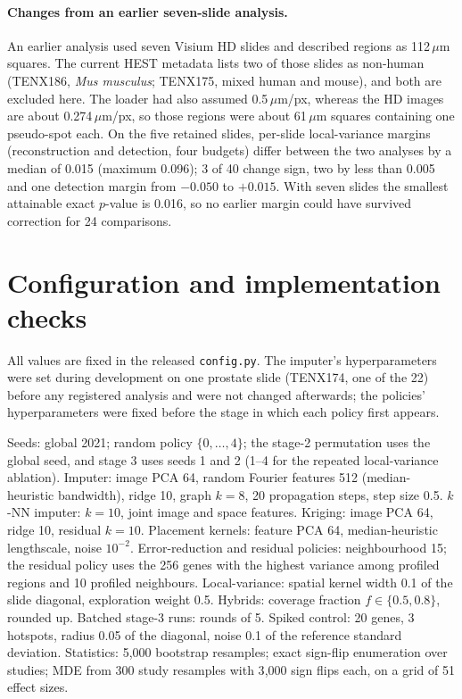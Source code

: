 \documentclass[10pt]{article}
\begin{document}
\paragraph{Changes from an earlier seven-slide analysis.} An earlier analysis used seven Visium HD slides and
described regions as 112\,$\mu$m squares. The current HEST metadata lists two of those slides as non-human (TENX186,
\emph{Mus musculus}; TENX175, mixed human and mouse), and both are excluded here. The loader had also assumed
0.5\,$\mu$m/px, whereas the HD images are about 0.274\,$\mu$m/px, so those regions were about 61\,$\mu$m squares
containing one pseudo-spot each. On the five retained slides, per-slide local-variance margins (reconstruction and
detection, four budgets) differ between the two analyses by a median of 0.015 (maximum 0.096); 3 of 40 change sign,
two by less than 0.005 and one detection margin from $-0.050$ to $+0.015$. With seven slides the smallest attainable
exact $p$-value is 0.016, so no earlier margin could have survived correction for 24 comparisons.

\section{Configuration and implementation checks}
\label{app:repro}

All values are fixed in the released \texttt{config.py}. The imputer's hyperparameters were set during development
on one prostate slide (TENX174, one of the 22) before any registered analysis and were not changed afterwards; the
policies' hyperparameters were fixed before the stage in which each policy first appears.

Seeds: global 2021; random policy $\{0,\dots,4\}$; the stage-2 permutation uses the global seed, and stage 3 uses
seeds 1 and 2 (1--4 for the repeated local-variance ablation). Imputer: image PCA 64, random Fourier features 512
(median-heuristic bandwidth), ridge 10, graph $k=8$, 20 propagation steps, step size 0.5. $k$-NN imputer: $k=10$,
joint image and space features. Kriging: image PCA 64, ridge 10, residual $k=10$. Placement kernels: feature PCA 64,
median-heuristic lengthscale, noise $10^{-2}$. Error-reduction and residual policies: neighbourhood 15; the residual
policy uses the 256 genes with the highest variance among profiled regions and 10 profiled neighbours.
Local-variance: spatial kernel width 0.1 of the slide diagonal, exploration weight 0.5. Hybrids: coverage fraction
$f\in\{0.5,0.8\}$, rounded up. Batched stage-3 runs: rounds of 5. Spiked control: 20 genes, 3 hotspots, radius 0.05
of the diagonal, noise 0.1 of the reference standard deviation. Statistics: 5{,}000 bootstrap resamples; exact
sign-flip enumeration over studies; MDE from 300 study resamples with 3{,}000 sign flips each, on a grid of 51
effect sizes.
\end{document}
